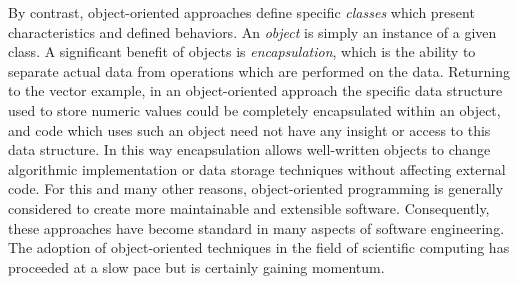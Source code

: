 By contrast, object-oriented approaches define specific \emph{classes} which present characteristics and defined behaviors.  An \emph{object} is simply an instance of a given class.  A significant benefit of objects is \emph{encapsulation}, which is the ability to separate actual data from operations which are performed on the data.  Returning to the vector example, in an object-oriented approach the specific data structure used to store numeric values could be completely encapsulated within an object, and code which uses such an object need not have any insight or access to this data structure. In this way encapsulation allows well-written objects to change algorithmic implementation or data storage techniques without affecting external code.   For this and many other reasons, object-oriented programming is generally considered to create more maintainable and extensible software.  Consequently, these approaches have become standard in many aspects of software engineering.  The adoption of object-oriented techniques in the field of scientific computing has proceeded at a slow pace but is certainly gaining momentum.  



\clearpage
